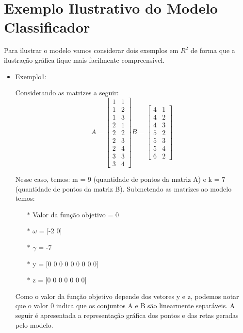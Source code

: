 \section{Exemplo Ilustrativo do Modelo Classificador}
Para ilustrar o modelo vamos considerar dois exemplos em $R^{2}$ \cite{Bennett92robustlinear} de forma que a ilustração gráfica fique mais facilmente compreensível.
\begin{itemize}
\item Exemplo1:

Considerando as matrizes a seguir:
$$A=\begin{bmatrix}1 & 1\\ 1 & 2\\ 1 & 3\\ 2 & 1\\ 2 & 2\\ 2 & 3\\ 2 & 4\\ 3 & 3\\ 3 & 4\end{bmatrix}
B=\begin{bmatrix}4 & 1\\ 4 & 2\\ 4 & 3\\ 5 & 2\\ 5 & 3\\ 5 & 4\\ 6 & 2\end{bmatrix}$$

Nesse caso, temos: m = 9 (quantidade de pontos da matriz A) e k = 7 (quantidade de pontos da matriz B).  Submetendo as matrizes ao modelo temos:
\begin{itemize}
\item[$\ast$] Valor da função objetivo = 0
\item[$\ast$] $\omega$ = [-2  0]
\item[$\ast$] $\gamma$ = -7
\item[$\ast$] y = [0 0 0 0 0 0 0 0 0]
\item[$\ast$] z = [0 0 0 0 0 0 0]
\end{itemize}
Como o valor da função objetivo depende dos vetores y e z, podemos notar que o valor 0 indica que os conjuntos A e B são linearmente separáveis. A seguir é apresentada a representação gráfica dos pontos e das retas geradas pelo modelo.


\end{itemize}
